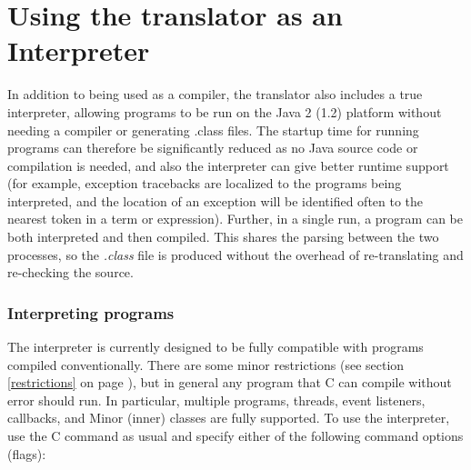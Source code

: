 \chapter{Using the translator as an Interpreter}
In addition to being used as a compiler, the translator also includes a
true \nr{} interpreter, allowing \nr{} programs to be run on the
Java 2 (1.2) platform without needing a compiler or generating .class
files.
\newline
The startup time for running programs can therefore be significantly
reduced as no Java source code or compilation is needed, and also the
interpreter can give better runtime support (for example, exception
tracebacks are localized to the programs being interpreted, and the
location of an exception will be identified often to the nearest token
in a term or expression).
\newline
Further, in a single run, a \nr{} program can be both interpreted and
then compiled.  This shares the parsing between the two processes, so
the \emph{.class} file is produced without the overhead of
re-translating and re-checking the source.

\subsection{Interpreting programs}
The \nr{} interpreter is currently designed to be fully compatible
with \nr{} programs compiled conventionally.  There are some minor
restrictions (see section \ref{restrictions} on page \pageref{restrictions}), but in general any program that \nr{}C
can compile without error should run.  In particular, multiple programs,
threads, event listeners, callbacks, and Minor (inner) classes are fully
supported.
\newline
To use the interpreter, use the \nr{}C command as usual and specify
either of the following command options (flags):

